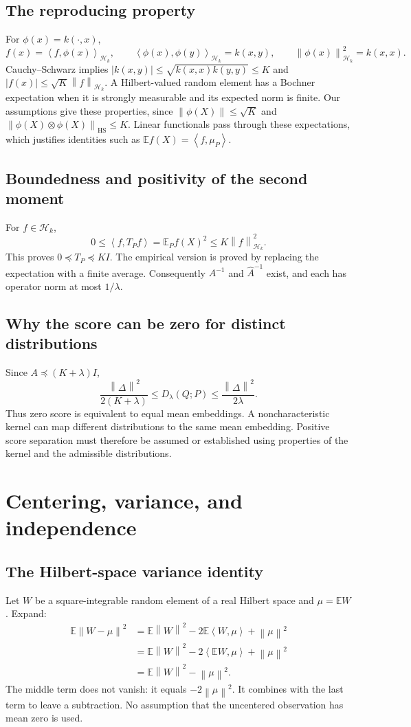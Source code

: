 \documentclass[11pt,a4paper]{article}
\theoremstyle{definition}
\theoremstyle{remark}
\newcommand{\HH}{\mathcal H_k}
\newcommand{\E}{\mathbb E}
\newcommand{\norm}[1]{\left\lVert#1\right\rVert}
\newcommand{\inner}[2]{\left\langle#1,#2\right\rangle}
\newcommand{\HS}{\mathrm{HS}}
\newcommand{\D}{D_\lambda(Q;P)}
\begin{document}
\subsection{The reproducing property}
For $\phi(x)=k(\cdot,x)$,
\[
 f(x)=\inner{f}{\phi(x)}_{\HH},\qquad
 \inner{\phi(x)}{\phi(y)}_{\HH}=k(x,y),\qquad
 \norm{\phi(x)}_{\HH}^2=k(x,x).
\]
Cauchy--Schwarz implies $|k(x,y)|\le\sqrt{k(x,x)k(y,y)}\le K$
and $|f(x)|\le\sqrt K\norm{f}_{\HH}$.
A Hilbert-valued random element has a Bochner expectation when it is
strongly measurable and its expected norm is finite. Our assumptions
give these properties, since $\norm{\phi(X)}\le\sqrt K$ and
$\norm{\phi(X)\otimes\phi(X)}_{\HS}\le K$.
Linear functionals pass through these expectations, which justifies
identities such as $\E f(X)=\inner{f}{\mu_P}$.

\subsection{Boundedness and positivity of the second moment}
For $f\in\HH$,
\[
 0\le\inner{f}{T_Pf}=\E_P f(X)^2
 \le K\norm{f}_{\HH}^2.
\]
This proves $0\preceq T_P\preceq KI$.
The empirical version is proved by replacing the expectation with a
finite average. Consequently $A^{-1}$ and $\widehat A^{-1}$ exist,
and each has operator norm at most $1/\lambda$.

\subsection{Why the score can be zero for distinct distributions}
Since $A\preceq(K+\lambda)I$,
\begin{equation}\label{eq:score-MMD}
 \frac{\norm{\Delta}^2}{2(K+\lambda)}
 \le\D\le\frac{\norm{\Delta}^2}{2\lambda}.
\end{equation}
Thus zero score is equivalent to equal mean embeddings. A noncharacteristic
kernel can map different distributions to the same mean embedding.
Positive score separation must therefore be assumed or established
using properties of the kernel and the admissible distributions.

\section{Centering, variance, and independence}\label{app:variance}

\subsection{The Hilbert-space variance identity}
Let $W$ be a square-integrable random element of a real Hilbert space
and $\mu=\E W$. Expand:
\begin{align*}
 \E\norm{W-\mu}^2
 &=\E\norm{W}^2-2\E\inner{W}{\mu}+\norm{\mu}^2\\
 &=\E\norm{W}^2-2\inner{\E W}{\mu}+\norm{\mu}^2\\
 &=\E\norm{W}^2-\norm{\mu}^2.
\end{align*}
The middle term does not vanish: it equals $-2\norm{\mu}^2$.
It combines with the last term to leave a subtraction.
No assumption that the uncentered observation has mean zero is used.
\end{document}
